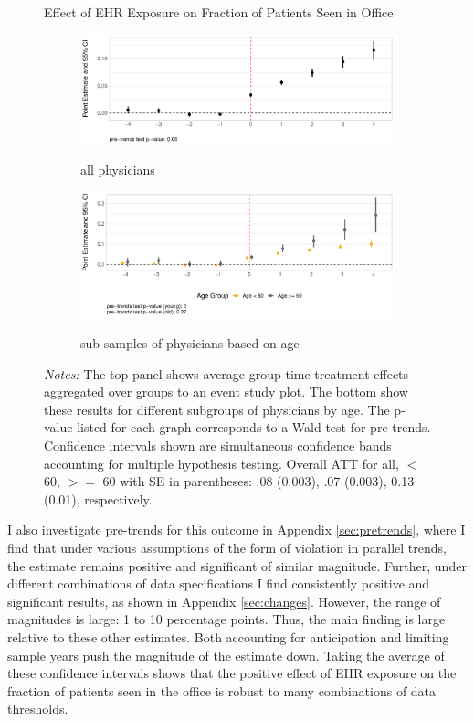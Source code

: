 \documentclass[12pt]{article}
\begin{document}
\begin{figure}[ht!]
\centering
    \captionsetup{width=.7\linewidth}
    \caption{Effect of EHR Exposure on Fraction of Patients Seen in Office}
   \begin{subfigure}[]{.8\textwidth}
   \caption{all physicians}
   \includegraphics[scale=.45]{Objects/officefrac_plot_all.pdf}
   \label{fig:officeseconda} 
\end{subfigure}

\vspace{3mm}

\begin{subfigure}[]{.8\textwidth}
\caption{sub-samples of physicians based on age}
   \includegraphics[scale=.45]{Objects/officefrac_plot_ages.pdf}
   \label{fig:officesecondb}
\end{subfigure}
\vspace{2mm}
    \caption*{\footnotesize{\textit{Notes:} The top panel shows average group time treatment effects aggregated over groups to an event study plot. The bottom show these results for different subgroups of physicians by age. The p-value listed for each graph corresponds to a Wald test for pre-trends. Confidence intervals shown are simultaneous confidence bands accounting for multiple hypothesis testing. Overall ATT for all, $<$ 60, $>=$ 60 with SE in parentheses: .08 (0.003), .07 (0.003), 0.13 (0.01), respectively.}}
\end{figure}


I also investigate pre-trends for this outcome in Appendix \ref{sec:pretrends}, where I find that under various assumptions of the form of violation in parallel trends, the estimate remains positive and significant of similar magnitude. Further, under different combinations of data specifications I find consistently positive and significant results, as shown in Appendix \ref{sec:changes}. However, the range of magnitudes is large: 1 to 10 percentage points. Thus, the main finding is large relative to these other estimates. Both accounting for anticipation and limiting sample years push the magnitude of the estimate down. Taking the average of these confidence intervals shows that the positive effect of EHR exposure on the fraction of patients seen in the office is robust to many combinations of data thresholds. 
\end{document}
